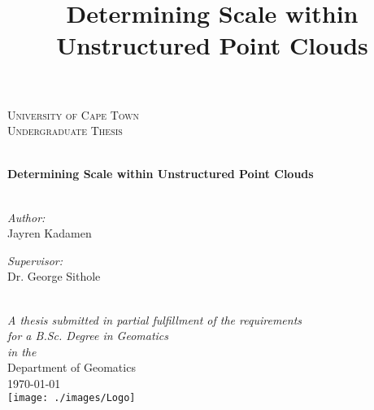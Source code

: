 
\frontmatter	  %

	\begin{center}
		
		\textsc{\LARGE University of Cape Town}\\[1.5cm] %
		\textsc{\Large Undergraduate Thesis}\\[0.5cm] %
		
		\HRule \\[0.4cm] %
		\title{Determining Scale within Unstructured Point Clouds}
		{\huge \bfseries Determining Scale within Unstructured Point Clouds}\\[0.4cm] %
		\HRule \\[1.5cm] %
		
		\begin{minipage}{0.4\textwidth}
			\begin{flushleft} \large
				\emph{Author:}\\
				\textnormal{Jayren Kadamen} %
			\end{flushleft}
		\end{minipage}
		\begin{minipage}{0.4\textwidth}
			\begin{flushright} \large
				\emph{Supervisor:} \\
				\textnormal{Dr. George Sithole} %
			\end{flushright}
		\end{minipage}\\[3cm]
		
		\large \textit{A thesis submitted in partial fulfillment of the requirements\\ for a B.Sc. Degree in Geomatics}\\[0.3cm] %
		\textit{in the}\\[0.4cm]
		Department of Geomatics\\[2cm] %
		
		{\large \today}\\[1cm] %
		\texttt{[image: ./images/Logo]} %
		
		\vfill
	\end{center}
